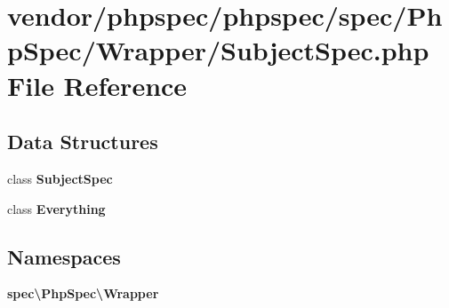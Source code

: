 \section{vendor/phpspec/phpspec/spec/\+Php\+Spec/\+Wrapper/\+Subject\+Spec.php File Reference}
\label{_subject_spec_8php}
\subsection*{Data Structures}
\begin{DoxyCompactItemize}
\item 
class {\bf Subject\+Spec}
\item 
class {\bf Everything}
\end{DoxyCompactItemize}
\subsection*{Namespaces}
\begin{DoxyCompactItemize}
\item 
 {\bf spec\textbackslash{}\+Php\+Spec\textbackslash{}\+Wrapper}
\end{DoxyCompactItemize}

